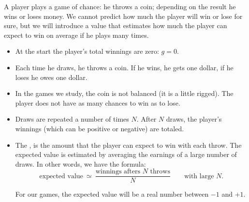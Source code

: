 \documentclass[11pt,class=report,crop=false]{standalone}
\begin{document}



\begin{cours}


A player plays a game of chance: he throws a coin; depending on the result he wins or loses money. We cannot predict how much the player will win or lose for sure, but we will introduce a value that estimates how much the player can expect to win on average if he plays many times.

\begin{itemize}
  \item At the start the player's total winnings are zero: $g=0$.
  
  \item Each time he draws, he throws a coin. If he wins, he gets one dollar, if he loses he owes one dollar.
  
  \item In the games we study, the coin is not balanced (it is a little rigged). The player does not have as many chances to win as to lose.
  
  \item Draws are repeated a number of times $N$. After $N$ draws, the player's winnings (which can be positive or negative) are totaled.
  
  \item The , is the amount that the player can expect to win with each throw. The expected value is estimated by averaging the earnings of a large number of draws. In other words, we have the formula:
   $$\text{expected value} \  \simeq \  \frac{\text{winnings afters $N$ throws}}{N} \qquad \text{with large $N$}.$$ 
   
   For our games, the expected value will be a real number between $-1$ and $+1$.
  

\end{itemize}
\end{cours}
\end{document}
